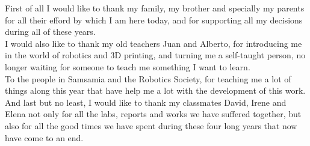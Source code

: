First of all I would like to thank my family, my brother and specially my parents for all their efford by which I am here today, and for supporting all my decisions during all of these years.\\

I would also like to thank my old teachers Juan and Alberto, for introducing me in the world of robotics and 3D printing, and turning me a self-taught person, no longer waiting for someone to teach me something I want to learn.\\

To the people in Samsamia and the Robotics Society, for teaching me a lot of things along this year that have help me a lot with the development of this work.\\

And last but no least, I would like to thank my classmates David, Irene and Elena not only for all the labs, reports and works we have suffered together, but also for all the good times we have spent during these four long years that now have come to an end.\\